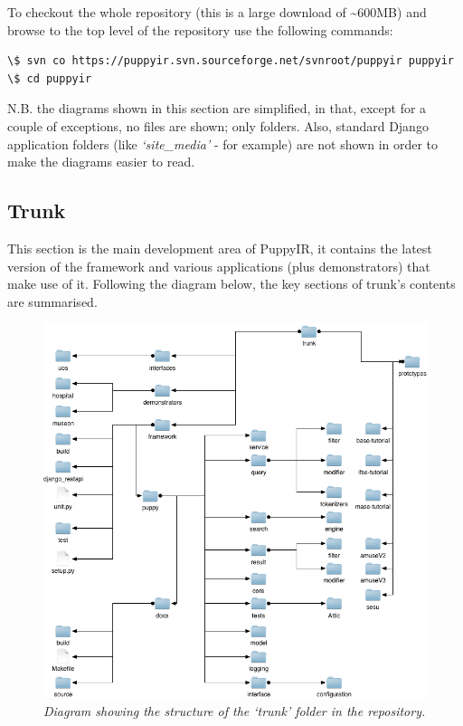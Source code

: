 \documentclass[letterpaper,10pt,english]{sphinxmanual}
\begin{document}
To checkout the whole repository (this is a large download of \textasciitilde{}600MB) and browse to the top level of the repository use the following commands:

\begin{Verbatim}[commandchars=\\\{\}]
\$ svn co https://puppyir.svn.sourceforge.net/svnroot/puppyir puppyir
\$ cd puppyir
\end{Verbatim}

N.B. the diagrams shown in this section are simplified, in that, except for a couple of exceptions, no files are shown; only folders. Also, standard Django application folders (like \emph{`site\_media'} - for example) are not shown in order to make the diagrams easier to read.


\subsection{Trunk}
\label{repo:trunk}
This section is the main development area of PuppyIR, it contains the latest version of the framework and various applications (plus demonstrators) that make use of it. Following the diagram below, the key sections of trunk's contents are summarised.
\begin{figure}[htbp]
\centering
\capstart

\includegraphics{trunk.png}
\caption{\emph{Diagram showing the structure of the `trunk' folder in the repository.}}\end{figure}
\end{document}
